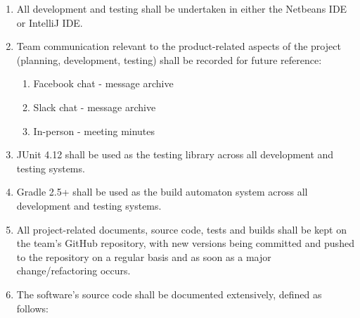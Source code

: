 \documentclass[11pt]{article}
\providecommand{\tightlist}{%
  \setlength{\itemsep}{0pt}\setlength{\parskip}{0pt}}
\begin{document}
\begin{enumerate}
\def\labelenumi{\arabic{enumi}.}
\tightlist
\item
  All development and testing shall be undertaken in either the Netbeans
  IDE or IntelliJ IDE.
\item
  Team communication relevant to the product-related aspects of the
  project (planning, development, testing) shall be recorded for future
  reference:

  \begin{enumerate}
  \def\labelenumii{\arabic{enumii}.}
  \tightlist
  \item
    Facebook chat - message archive
  \item
    Slack chat - message archive
  \item
    In-person - meeting minutes
  \end{enumerate}
\item
  JUnit 4.12 shall be used as the testing library across all development
  and testing systems.
\item
  Gradle 2.5+ shall be used as the build automaton system across all
  development and testing systems.
\item
  All project-related documents, source code, tests and builds shall be
  kept on the team's GitHub repository, with new versions being
  committed and pushed to the repository on a regular basis and as soon
  as a major change/refactoring occurs.
\item
  The software's source code shall be documented extensively, defined as
  follows:


\end{enumerate}
\end{document}
